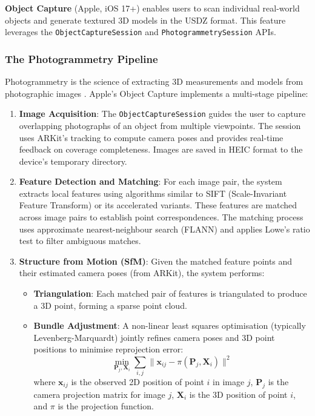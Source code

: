 \textbf{Object Capture} (Apple, iOS 17+) enables users to scan individual real-world objects and generate textured 3D models in the USDZ format. This feature leverages the \texttt{ObjectCaptureSession} and \texttt{PhotogrammetrySession} APIs.

\subsubsection{The Photogrammetry Pipeline}

Photogrammetry is the science of extracting 3D measurements and models from photographic images \cite{luhmann2014photogrammetry}. Apple's Object Capture implements a multi-stage pipeline:

\begin{enumerate}
    \item \textbf{Image Acquisition}: The \texttt{ObjectCaptureSession} guides the user to capture overlapping photographs of an object from multiple viewpoints. The session uses ARKit's tracking to compute camera poses and provides real-time feedback on coverage completeness. Images are saved in HEIC format to the device's temporary directory.

    \item \textbf{Feature Detection and Matching}: For each image pair, the system extracts local features using algorithms similar to SIFT (Scale-Invariant Feature Transform) \cite{lowe2004sift} or its accelerated variants. These features are matched across image pairs to establish point correspondences. The matching process uses approximate nearest-neighbour search (FLANN) and applies Lowe's ratio test to filter ambiguous matches.

    \item \textbf{Structure from Motion (SfM)}: Given the matched feature points and their estimated camera poses (from ARKit), the system performs:
    \begin{itemize}
        \item \textbf{Triangulation}: Each matched pair of features is triangulated to produce a 3D point, forming a sparse point cloud.
        \item \textbf{Bundle Adjustment}: A non-linear least squares optimisation (typically Levenberg-Marquardt) jointly refines camera poses and 3D point positions to minimise reprojection error:
        \[
            \min_{\mathbf{P}_j, \mathbf{X}_i} \sum_{i,j} \| \mathbf{x}_{ij} - \pi(\mathbf{P}_j, \mathbf{X}_i) \|^2
        \]
        where $\mathbf{x}_{ij}$ is the observed 2D position of point $i$ in image $j$, $\mathbf{P}_j$ is the camera projection matrix for image $j$, $\mathbf{X}_i$ is the 3D position of point $i$, and $\pi$ is the projection function.
    \end{itemize}


\end{enumerate}
